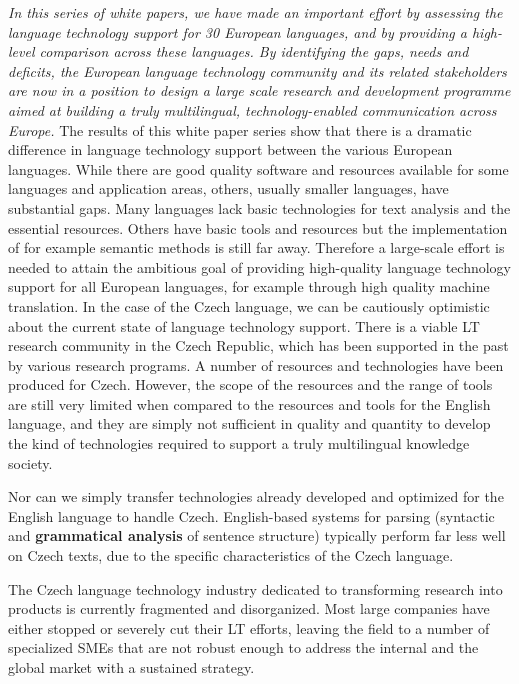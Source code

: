 \begin{multicols}{2}
\emph{In this series of white papers, we have made an important effort by assessing the language technology support for 30 European languages, and by providing a high-level comparison across these languages. By identifying the gaps, needs and deficits, the European language technology community and its related stakeholders are now in a position to design a large scale research and development programme aimed at building a truly multilingual, technology-enabled communication across Europe.}
The results of this white paper series show that there is a dramatic difference in language technology support between the various European languages. While there are good quality software and resources available for some languages and application areas, others, usually smaller languages, have substantial gaps. Many languages lack basic technologies for text analysis and the essential resources. Others have basic tools and resources but the implementation of for example semantic methods is still far away. Therefore a large-scale effort is needed to attain the ambitious goal of providing high-quality language technology support for all European languages, for example through high quality machine translation. 
In the case of the Czech language, we can be cautiously optimistic about the current state of language technology support. There is a viable LT research community in the Czech Republic, which has been supported in the past by various research programs. A number of resources and technologies have been produced for Czech. However, the scope of the resources and the range of tools are still very limited when compared to the resources and tools for the English language, and they are simply not sufficient in quality and quantity to develop the kind of technologies required to support a truly multilingual knowledge society.

Nor can we simply transfer technologies already developed and optimized for the English language to handle Czech. English-based systems for parsing (syntactic and \textbf{grammatical analysis} of sentence structure) typically perform far less well on Czech texts, due to the specific characteristics of the Czech language.

The Czech language technology industry dedicated to transforming research into products is currently fragmented and disorganized. Most large companies have either stopped or severely cut their LT efforts, leaving the field to a number of specialized SMEs that are not robust enough to address the internal and the global market with a sustained strategy. 


\end{multicols}
